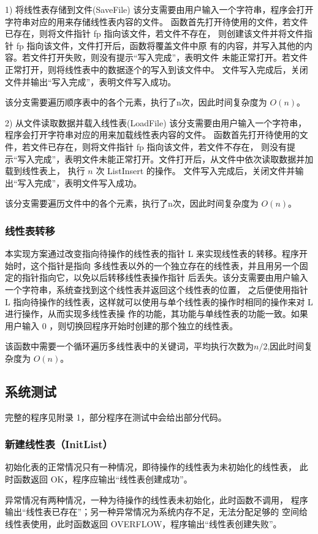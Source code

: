 \documentclass[supercite]{Experimental_Report}
\theoremstyle{definition}
\begin{document}
1) 将线性表存储到文件(SaveFile)
该分支需要由用户输入一个字符串，程序会打开字符串对应的用来存储线性表内容的文件。
函数首先打开待使用的文件，若文件已存在，则将文件指针 fp 指向该文件，若文件不存在，
则创建该文件并将文件指针 fp 指向该文件，文件打开后，函数将覆盖文件中原
有的内容，并写入其他的内容。若文件打开失败，则没有提示“写入完成”，表明文件
未能正常打开。若文件正常打开，则将线性表中的数据逐个的写入到该文件中。
文件写入完成后，关闭文件并输出“写入完成”，表明文件写入成功。

该分支需要遍历顺序表中的各个元素，执行了n次，因此时间复杂度为 $O(n)$。

2)  从文件读取数据并载入线性表(LoadFile)
该分支需要由用户输入一个字符串，程序会打开字符串对应的用来加载线性表内容的文件。
函数首先打开待使用的文件，若文件已存在，则将文件指针 fp 指向该文件，若文件不存在，
则没有提示“写入完成”，表明文件未能正常打开。文件打开后，从文件中依次读取数据并加载到线性表上，
执行 $n$ 次 ListInsert 的操作。
文件写入完成后，关闭文件并输出“写入完成”，表明文件写入成功。

该分支需要遍历文件中的各个元素，执行了n次，因此时间复杂度为 $O(n)$。
\subsubsection{线性表转移}
本实现方案通过改变指向待操作的线性表的指针 L 来实现线性表的转移。程序开始时，这个指针是指向
多线性表以外的一个独立存在的线性表，并且用另一个固定的指针指向它，以免以后转移线性表操作指针
后丢失。该分支需要由用户输入一个字符串，系统查找到这个线性表并返回这个线性表的位置，
之后便使用指针 L 指向待操作的线性表，这样就可以使用与单个线性表的操作时相同的操作来对 L 进行操作，从而实现多线性表操
作的功能，其功能与单线性表的功能一致。如果用户输入 0 ，则切换回程序开始时创建的那个独立的线性表。

该函数中需要一个循环遍历多线性表中的关键词，平均执行次数为$n/2$,因此时间复杂度为 $O(n)$。

\subsection{系统测试}
完整的程序见附录 1，部分程序在测试中会给出部分代码。
\subsubsection{新建线性表（InitList）}
初始化表的正常情况只有一种情况，即待操作的线性表为未初始化的线性表，
此时函数返回 OK，程序应输出“线性表创建成功”。

异常情况有两种情况，一种为待操作的线性表未初始化，此时函数不调用，
程序输出“线性表已存在”；另一种异常情况为系统内存不足，无法分配足够的
空间给线性表使用，此时函数返回 OVERFLOW，程序输出“线性表创建失败”。
\end{document}
